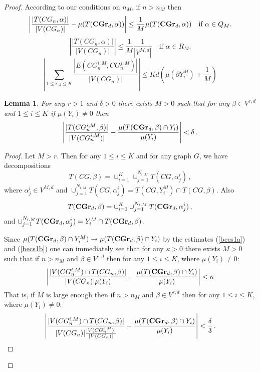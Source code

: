 \documentclass{article}
\newtheorem{lemma}{Lemma}[section]
\newcommand{\CGrd}[1][d]{\textrm{\textbf{CGr}}_{#1}}
\newcommand{\cgim}{CG_n^{i,M}}
\begin{document}
\begin{proof}
According to our conditions on $n_M$, if $n>n_M$ then
\begin{equation} \label{becs1a}
\left| \frac{|T(CG_n,\alpha)|}{|V(CG_n)|}-\mu(T(\CGrd,\alpha))\right|\leq 
\frac {1} {M} \mu(T(\CGrd,\alpha))
\quad\mbox{if $\alpha\in Q_M$.}
\end{equation}
\begin{equation} \label{becs1b}
\left| \frac{|T(CG_n,\alpha)|}{|V(CG_n)|}\right|\leq 
\frac {1} {M} \frac{1} {|V^{M,d}|}\quad\mbox{if $\alpha\in R_M$.}
\end{equation}
\begin{equation} \label{becs2}
\left| \sum_{1\leq i,j \leq K} \frac {|E(CG_n^{i,M}, CG_n^{j,M})|}
{|V(CG_n)|}\right| \leq K d\left(\mu(\partial Y^M_i)+\frac{1}{M}\right)
\end{equation}
\begin{lemma}
For any $r>1$ and $\delta>0$ there exists $M>0$ such that for any 
$\beta\in V^{r,d}$ and $1\leq i \leq K$ if $\mu(Y_i)\neq 0$ then
$$\left|\frac{|T(\cgim,\beta)|}{|V(\cgim)|}-\frac{\mu(T(\CGrd,\beta)\cap
Y_i)}{\mu(Y_i)}\right|<\delta\,.$$
\end{lemma}
\begin{proof}
Let $M>r$. Then for any $1\leq i \leq K$ and for any graph $G$, we
have decompositions
$$T(CG,\beta)=\cup^K_{i=1} \cup_{j=1}^{N_{i,M}} T(CG,\alpha^i_j)\,,$$
where $\alpha^i_j\in V^{M,d}$ and
$\cup_{j=1}^{N_{i,M}} T(CG,\alpha^i_j)=T(CG,Y^M_i)\cap T(CG,\beta)$.
Also
$$T(\CGrd,\beta)=\cup^K_{i=1} \cup_{j=1}^{N_{i,M}} T(\CGrd,\alpha^i_j)\,,$$
and $\cup_{j=1}^{N_{i,M}} T(\CGrd,\alpha^i_j)= Y^M_i\cap T(\CGrd,\beta)$.

\noindent
Since $\mu(T(\CGrd,\beta)\cap Y^M_i)\to \mu(T(\CGrd,\beta)\cap Y_i)$
by the estimates (\ref{becs1a}) and (\ref{becs1b}) one can immediately
see that for any $\kappa>0$ there exists $M>0$ such that if $n>n_M$
and $\beta\in V^{r,d}$ then for any $1\leq i \leq K$, where $\mu(Y_i)\neq
0$:
\begin{equation}
\label{becs4}
\left|\frac{|V(\cgim)\cap T(CG_n,\beta)|}{|V(CG_n)|\mu(Y_i)}-
\frac{\mu(T(\CGrd,\beta)\cap Y_i)}{\mu(Y_i)}\right|<\kappa
\end{equation}
That is, if $M$ is large enough then
 if $n>n_M$
and $\beta\in V^{r,d}$ then for any $1\leq i \leq K$, where $\mu(Y_i)\neq
0$:
\begin{equation}
\label{becs5}
\left|\frac{|V(\cgim)\cap T(CG_n,\beta)|}{|V(CG_n)|\frac{|V(\cgim)|}
{|V(CG_n)|}}-
\frac{\mu(T(\CGrd,\beta)\cap Y_i)}{\mu(Y_i)}\right|<\frac{\delta}{3}\,.
\end{equation}


\end{proof}
\end{proof}
\end{document}
